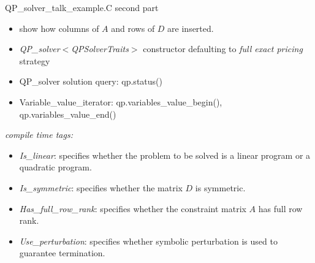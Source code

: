 \documentclass{slides}
\begin{document}
\begin{slide}
QP\_solver\_talk\_example.C second part
\end{slide}

\begin{note}
\begin{itemize}
\item show how columns of $A$ and rows of $D$ are inserted.
\item \emph{QP\_solver$<$QPSolverTraits$>$} constructor defaulting to
\emph{full exact pricing} strategy
\item QP\_solver solution query: qp.status()
\item Variable\_value\_iterator: qp.variables\_value\_begin(),
qp.variables\_value\_end()
\end{itemize}
\end{note}

%



\begin{slide}
\emph{compile time tags:}
\begin{itemize}
\item \emph{Is\_linear}: specifies whether the problem to be solved is a linear
program or a quadratic program.
\item \emph{Is\_symmetric}: specifies whether the matrix $D$ is symmetric.  
\item \emph{Has\_full\_row\_rank}: specifies whether the constraint matrix $A$
has full row rank.
\item \emph{Use\_perturbation}: specifies whether symbolic perturbation is 
used to guarantee termination.
\end{itemize}
\end{slide}
\end{document}
